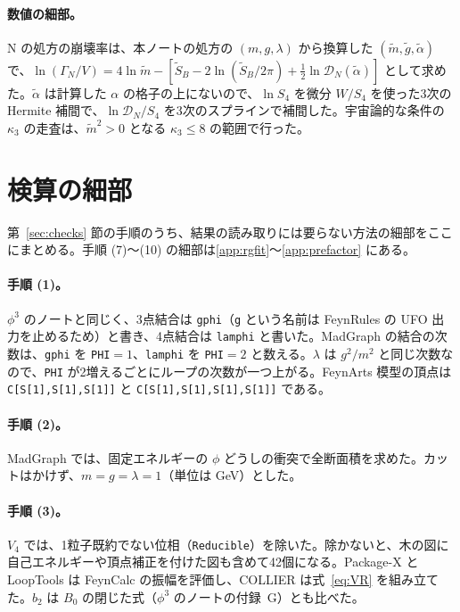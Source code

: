 \documentclass[a4paper,10pt]{ltjsarticle}
\begin{document}
\paragraph{数値の細部。}N の処方の崩壊率は、本ノートの処方の $(m,g,\lambda)$ から換算した $(\tilde m,\tilde g,\tilde\alpha)$ で、$\ln(\Gamma_N/V)=4\ln\tilde m-[\tilde S_B-2\ln(\tilde S_B/2\pi)+\frac12\ln\mathcal D_N(\tilde\alpha)]$ として求めた。$\tilde\alpha$ は計算した $\alpha$ の格子の上にないので、$\ln S_4$ を微分 $W/S_4$ を使った3次の Hermite 補間で、$\ln\mathcal D_N/S_4$ を3次のスプラインで補間した。宇宙論的な条件の $\kappa_3$ の走査は、$\tilde m^2>0$ となる $\kappa_3\le8$ の範囲で行った。

\section{検算の細部}\label{app:details}

第~\ref{sec:checks} 節の手順のうち、結果の読み取りには要らない方法の細部をここにまとめる。手順 (7)〜(10) の細部は\ref{app:rgfit}〜\ref{app:prefactor} にある。

\paragraph{手順 (1)。}$\phi^3$ のノートと同じく、3点結合は \texttt{gphi}（\texttt{g} という名前は FeynRules の UFO 出力を止めるため）と書き、4点結合は \texttt{lamphi} と書いた。MadGraph の結合の次数は、\texttt{gphi} を \texttt{PHI}$=1$、\texttt{lamphi} を \texttt{PHI}$=2$ と数える。$\lambda$ は $g^2/m^2$ と同じ次数なので、\texttt{PHI} が2増えるごとにループの次数が一つ上がる。FeynArts 模型の頂点は \texttt{C[S[1],S[1],S[1]]} と \texttt{C[S[1],S[1],S[1],S[1]]} である。

\paragraph{手順 (2)。}MadGraph では、固定エネルギーの $\phi$ どうしの衝突で全断面積を求めた。カットはかけず、$m=g=\lambda=1$（単位は GeV）とした。

\paragraph{手順 (3)。}$V_4$ では、1粒子既約でない位相（\texttt{Reducible}）を除いた。除かないと、木の図に自己エネルギーや頂点補正を付けた図も含めて42個になる。Package-X と LoopTools は FeynCalc の振幅を評価し、COLLIER は式~\eqref{eq:VR} を組み立てた。$b_2$ は $B_0$ の閉じた式（$\phi^3$ のノートの付録~G）とも比べた。
\end{document}
